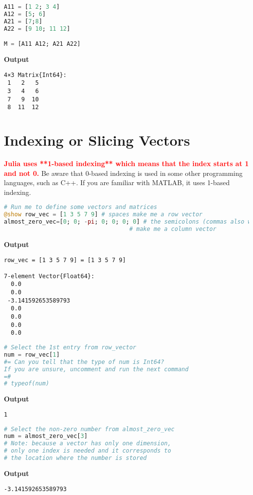 \begin{lstlisting}[language=Julia,style=mystyle]
A11 = [1 2; 3 4]
A12 = [5; 6]
A21 = [7;8]
A22 = [9 10; 11 12]

M = [A11 A12; A21 A22] 
\end{lstlisting}
\textbf{Output} 
\begin{verbatim}
4×3 Matrix{Int64}:
 1   2   5
 3   4   6
 7   9  10
 8  11  12
\end{verbatim}


\section{Indexing or Slicing Vectors}

\begin{rem}
\textcolor{red}{\bf Julia uses **1-based indexing** which means that the index starts at 1 and not 0.} Be aware that 0-based indexing is used in some other programming languages, such as C++. If you are familiar with MATLAB, it uses 1-based indexing.
\end{rem}


\begin{lstlisting}[language=Julia,style=mystyle]
# Run me to define some vectors and matrices
@show row_vec = [1 3 5 7 9] # spaces make me a row vector
almost_zero_vec=[0; 0; -pi; 0; 0; 0; 0] # the semicolons (commas also work) 
                                    # make me a column vector 
\end{lstlisting}
\textbf{Output} 
\begin{verbatim}
row_vec = [1 3 5 7 9] = [1 3 5 7 9]

7-element Vector{Float64}:
  0.0
  0.0
 -3.141592653589793
  0.0
  0.0
  0.0
  0.0
\end{verbatim}


\begin{lstlisting}[language=Julia,style=mystyle]
# Select the 1st entry from row_vector
num = row_vec[1]
#= Can you tell that the type of num is Int64? 
If you are unsure, uncomment and run the next command
=#
# typeof(num)
\end{lstlisting}
\textbf{Output} 
\begin{verbatim}
1
\end{verbatim}

\begin{lstlisting}[language=Julia,style=mystyle]
# Select the non-zero number from almost_zero_vec
num = almost_zero_vec[3]
# Note: because a vector has only one dimension, 
# only one index is needed and it corresponds to 
# the location where the number is stored
\end{lstlisting}
\textbf{Output} 
\begin{verbatim}
-3.141592653589793
\end{verbatim}

